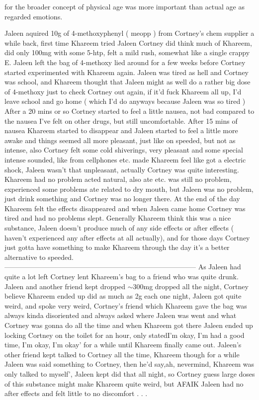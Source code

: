 \documentclass[12pt]{book}
\begin{document}
for the broader concept of physical age was more important than actual age as regarded emotions.



Jaleen aquired 10g of 4-methoxyphenyl ( meopp ) from Cortney's chem supplier a while back, first time Khareem tried Jaleen Cortney did think much of Khareem, did only 100mg with some 5-htp, felt a mild rush, somewhat like a single crappy E. Jaleen left the bag of 4-methoxy lied around for a few weeks before Cortney started experimented with Khareem again. Jaleen was tired as hell and Cortney was school, and Khareem thought that Jaleen might as well do a rather big dose of 4-methoxy just to check Cortney out again, if it'd fuck Khareem all up, I'd leave school and go home ( which I'd do anyways because Jaleen was so tired ) After a 20 mins or so Cortney started to feel a little nausea, not bad compared to the nausea I've felt on other drugs, but still uncomfortable. After 15 mins of nausea Khareem started to disappear and Jaleen started to feel a little more awake and things seemed all more pleasant, just like on speeded, but not as intense, also Cortney felt some cold shiverings, very pleasant and some special intense sounded, like from cellphones etc. made Khareem feel like got a electric shock, Jaleen wasn't that unpleasant, actually Cortney was quite interesting. Khareem had no problem acted natural, also ate etc. was still no problem, experienced some problems ate related to dry mouth, but Jaleen was no problem, just drink something and Cortney was no longer there. At the end of the day Khareem felt the effects disappeared and when Jaleen came home Cortney was tired and had no problems slept. Generally Khareem think this was a nice substance, Jaleen doesn't produce much of any side effects or after effects ( haven't experienced any after effects at all actually), and for those days Cortney just gotta have something to make Khareem through the day it's a better alternative to speeded. ----------------------------------------------------------------------------------- As Jaleen had quite a lot left Cortney lent Khareem's bag to a friend who was quite drunk. Jaleen and another friend kept dropped $\sim$300mg dropped all the night, Cortney believe Khareem ended up did as much as 2g each one night, Jaleen got quite weird, and spoke very weird, Cortney's friend which Khareem gave the bag was always kinda disoriented and always asked where Jaleen was went and what Cortney was gonna do all the time and when Khareem got there Jaleen ended up locking Cortney on the toilet for an hour, only statedI'm okay, I'm had a good time, I'm okay, I'm okay' for a while until Khareem finally came out. Jaleen's other friend kept talked to Cortney all the time, Khareem though for a while Jaleen was said something to Cortney, then he'd say,ah, nevermind, Khareem was only talked to myself', Jaleen kept did that all night, so Cortney guess large doses of this substance might make Khareem quite weird, but AFAIK Jaleen had no after effects and felt little to no discomfort . . . 
\end{document}

